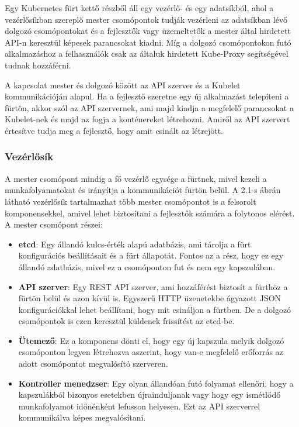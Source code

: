 Egy Kubernetes fürt kettő részből áll egy vezérlő- és egy adatsíkból, ahol a 
vezérlősíkban szereplő mester csomópontok tudják vezérleni az adatsíkban 
lévő dolgozó csomópontokat és a fejlesztők vagy üzemeltetők a mester által
hirdetett API-n keresztül képesek parancsokat kiadni. Míg a dolgozó 
csomópontokon futó alkalmazáshoz a felhasználók csak az általuk hirdetett 
Kube-Proxy segítségével tudnak hozzáférni. 

A kapcsolat mester és dolgozó között az API szerver és a Kubelet kommunikációján
alapul. Ha a fejlesztő szeretne egy új alkalmazást telepíteni a fürtön, akkor
szól az API szervernek, ami majd kiadja a megfelelő parancsokat a Kubelet-nek 
és majd az fogja a konténereket létrehozni. Amiről az API szervert értesítve 
tudja meg a fejlesztő, hogy amit csinált az létrejött.

\subsubsection{Vezérlősík}

A mester csomópont mindig a fő vezérlő egysége a fürtnek, mivel kezeli a 
munkafolyamatokat és irányítja a kommunikációt fürtön belül. A 2.1-s ábrán
látható vezérlősík tartalmazhat  több mester csomópontot is a felsorolt 
komponensekkel, amivel lehet biztosítani a fejlesztők számára a folytonos 
elérést. A mester csomópont részei: 

\begin{itemize}
	\item \textbf{etcd}: Egy állandó kulcs-érték alapú adatbázis, ami tárolja 
	a fürt konfigurációs beállításait és a fürt állapotát. Fontos az a rész, 
	hogy ez egy állandó adatbázis, mivel ez a csomóponton fut és nem egy 
	kapszulában.   
	\item \textbf{API szerver}: Egy REST API szerver, ami hozzáférést biztosít
	a fürthöz a fürtön belül és azon kívül is. Egyszerű HTTP üzenetekbe ágyazott
	JSON konfigurációkkal lehet beállítani, hogy mit csináljon a fürtben. De 
	a dolgozó csomópontok is ezen keresztül küldenek frissítést az etcd-be. 
	\item \textbf{Ütemező}: Ez a komponens dönti el, hogy egy új kapszula melyik
	dolgozó csomóponton legyen létrehozva aszerint, hogy van-e megfelelő erőforrás
	az adott csomópontot megvalósító szerveren.
	\item \textbf{Kontroller menedzser}: Egy olyan állandóan futó folyamat ellenőri,
	hogy a kapszulákból bizonyos esetekben újrainduljanak vagy hogy egy ismétlődő 
	munkafolyamot időnénként lefusson helyesen. Ezt az API szerverrel kommunikálva
	képes megvalósítani. 
\end{itemize}

